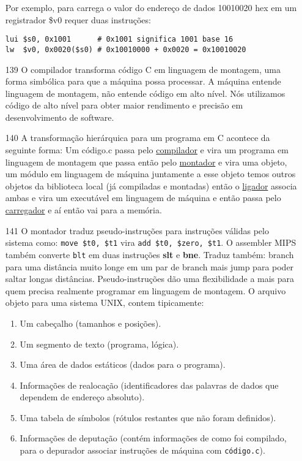 \documentclass{article}
\begin{document}
\begin{enumerate}
Por exemplo, para carrega o valor do endereço de dados 10010020 hex em um 
registrador \$v0 requer duas instruções:

\begin{verbatim}
lui $s0, 0x1001      # 0x1001 significa 1001 base 16
lw  $v0, 0x0020($s0) # 0x10010000 + 0x0020 = 0x10010020
\end{verbatim}

\item[139] O compilador transforma código C em linguagem de montagem, uma forma 
simbólica para que a máquina possa processar. A máquina entende linguagem de 
montagem, não entende código em alto nível. Nós utilizamos código de alto nível 
para obter maior rendimento e precisão em desenvolvimento de software.

\item[140] A transformação hierárquica para um programa em C acontece da 
seguinte forma: Um código.c passa pelo \underline{compilador} e vira um 
programa em linguagem de montagem que passa então pelo \underline{montador} e 
vira uma objeto, um módulo em linguagem de máquina juntamente a esse objeto 
temos outros objetos da biblioteca local (já compiladas e montadas) então o 
\underline{ligador} associa ambas e vira um executável em linguagem de máquina 
e então passa pelo \underline{carregador} e aí então vai para a memória.

\item[141] O montador traduz pseudo-instruções para instruções válidas pelo 
sistema como: \verb|move $t0, $t1| vira \verb|add $t0, $zero, $t1|. O assembler 
MIPS também converte \verb|blt| em duas instruções \textbf{slt} e \textbf{bne}. 
Traduz também: branch para uma distância muito longe em um par de branch mais 
jump para poder saltar longas distâncias. Pseudo-instruções dão uma 
flexibilidade a mais para quem precisa realmente programar em linguagem de 
montagem. O arquivo objeto para uma sistema UNIX, contem tipicamente:

\begin{enumerate}
\item Um cabeçalho (tamanhos e posições).
\item Um segmento de texto (programa, lógica).
\item Uma área de dados estáticos (dados para o programa).
\item Informações de realocação (identificadores das palavras de dados que 
dependem de endereço absoluto).
\item Uma tabela de símbolos (rótulos restantes que não foram definidos).
\item Informações de deputação (contém informações de como foi compilado, para 
o depurador associar instruções de máquina com \verb|código.c|).
\end{enumerate}


\end{enumerate}
\end{document}

